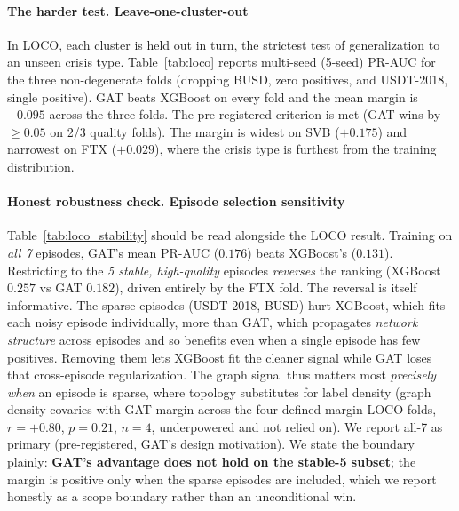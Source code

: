 \documentclass[sigconf,anonymous]{acmart}
\begin{document}
\paragraph{The harder test. Leave-one-cluster-out} In LOCO, each cluster is held out in turn, the
strictest test of generalization to an unseen crisis type. Table~\ref{tab:loco} reports multi-seed
(5-seed) PR-AUC for the three non-degenerate folds (dropping BUSD, zero positives, and USDT-2018,
single positive). GAT beats XGBoost on every fold and the mean margin is $\mathbf{+0.095}$ across
the three folds. The pre-registered criterion is met (GAT wins by $\ge 0.05$ on 2/3 quality folds).
The margin is widest on SVB ($+0.175$) and narrowest on FTX ($+0.029$), where the crisis type is
furthest from the training distribution.

\paragraph{Honest robustness check. Episode selection sensitivity}
Table~\ref{tab:loco_stability} should be read alongside the LOCO result. Training on \emph{all 7}
episodes, GAT's mean PR-AUC ($0.176$) beats XGBoost's ($0.131$). Restricting to the \emph{5 stable,
high-quality} episodes \emph{reverses} the ranking (XGBoost $0.257$ vs GAT $0.182$), driven entirely
by the FTX fold. The reversal is itself informative. The sparse episodes (USDT-2018, BUSD) hurt
XGBoost, which fits each noisy episode individually, more than GAT, which propagates \emph{network
structure} across episodes and so benefits even when a single episode has few positives. Removing
them lets XGBoost fit the cleaner signal while GAT loses that cross-episode regularization. The graph
signal thus matters most \emph{precisely when} an episode is sparse, where topology substitutes for
label density (graph density covaries with GAT margin across the four defined-margin LOCO folds,
$r{=}{+}0.80$, $p{=}0.21$, $n{=}4$, underpowered and not relied on). We report all-7 as primary
(pre-registered, GAT's design motivation). We state the boundary plainly:
\textbf{GAT's advantage does not hold on the stable-5 subset}; the margin is positive only
when the sparse episodes are included, which we report honestly as a scope boundary rather
than an unconditional win.
\end{document}
